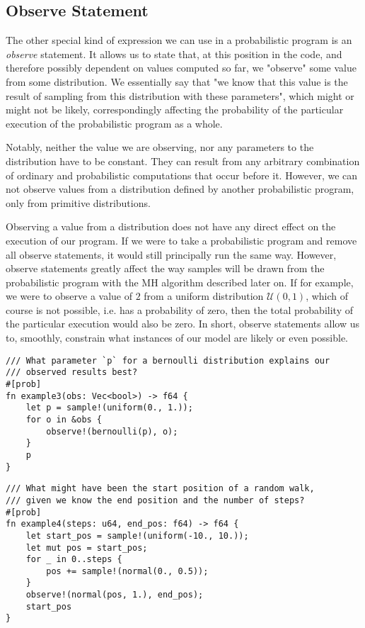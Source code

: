 \subsection{Observe Statement}

The other special kind of expression we can use in a probabilistic program is an \textit{observe} statement. It allows us to state that, at this position in the code, and therefore possibly dependent on values computed so far, we "observe" some value from some distribution. We essentially say that "we know that this value is the result of sampling from this distribution with these parameters", which might or might not be likely, correspondingly affecting the probability of the particular execution of the probabilistic program as a whole. 

Notably, neither the value we are observing, nor any parameters to the distribution have to be constant. They can result from any arbitrary combination of ordinary and probabilistic computations that occur before it. However, we can not observe values from a distribution defined by another probabilistic program, only from primitive distributions.

Observing a value from a distribution does not have any direct effect on the execution of our program. If we were to take a probabilistic program and remove all observe statements, it would still principally run the same way. However, observe statements greatly affect the way samples will be drawn from the probabilistic program with the MH algorithm described later on. If for example, we were to observe a value of $2$ from a uniform distribution $\mathcal{U}(0,1)$, which of course is not possible, i.e. has a probability of zero, then the total probability of the particular execution would also be zero. In short, observe statements allow us to, smoothly, constrain what instances of our model are likely or even possible.

\begin{minipage}{\linewidth}
\begin{lstlisting}
/// What parameter `p` for a bernoulli distribution explains our
/// observed results best?
#[prob]
fn example3(obs: Vec<bool>) -> f64 {
    let p = sample!(uniform(0., 1.));
    for o in &obs {
        observe!(bernoulli(p), o);
    }
    p
}
\end{lstlisting}
\end{minipage}

\begin{minipage}{\linewidth}
\begin{lstlisting}
/// What might have been the start position of a random walk,
/// given we know the end position and the number of steps?
#[prob]
fn example4(steps: u64, end_pos: f64) -> f64 {
    let start_pos = sample!(uniform(-10., 10.));
    let mut pos = start_pos;
    for _ in 0..steps {
        pos += sample!(normal(0., 0.5));
    }
    observe!(normal(pos, 1.), end_pos);
    start_pos
}
\end{lstlisting}
\end{minipage}


